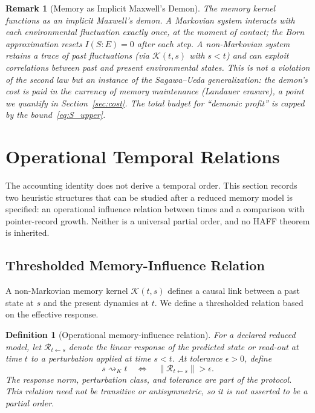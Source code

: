 \documentclass[12pt]{article}
\newtheorem{definition}[theorem]{Definition}
\newtheorem{remark}[theorem]{Remark}
\begin{document}
\begin{remark}[Memory as Implicit Maxwell's Demon]
\label{rem:demon}
The memory kernel functions as an \emph{implicit Maxwell's demon}.
A Markovian system interacts with each environmental fluctuation
exactly once, at the moment of contact; the Born approximation
resets $I(S{:}E) = 0$ after each step.
A non-Markovian system retains a trace of past fluctuations
(via $\mathcal{K}(t,s)$ with $s < t$) and can exploit
correlations between past and present environmental states.
This is not a violation of the second law but an instance of
the Sagawa--Ueda generalization: the demon's cost is paid in
the currency of memory maintenance (Landauer erasure), a point
we quantify in Section~\ref{sec:cost}.
The total budget for ``demonic profit'' is capped by the
bound~\eqref{eq:S_upper}.
\end{remark}

\section{Operational Temporal Relations}
\label{sec:arrow}

The accounting identity does not derive a temporal order.  This section
records two heuristic structures that can be studied after a reduced
memory model is specified: an operational influence relation between
times and a comparison with pointer-record growth.  Neither is a
universal partial order, and no HAFF theorem is inherited.

\subsection{Thresholded Memory-Influence Relation}

A non-Markovian memory kernel $\mathcal{K}(t,s)$ defines a
causal link between a past state at $s$ and the present dynamics
at $t$.
We define a thresholded relation based on the effective response.

\begin{definition}[Operational memory-influence relation]
\label{def:memory_order}
For a declared reduced model, let $\mathcal R_{t\leftarrow s}$ denote
the linear response of the predicted state or read-out at time $t$ to
a perturbation applied at time $s<t$.  At tolerance $\epsilon>0$, define
\begin{equation}
\label{eq:memory_order}
s\rightsquigarrow_K t
\quad\Longleftrightarrow\quad
\|\mathcal R_{t\leftarrow s}\|>\epsilon .
\end{equation}
The response norm, perturbation class, and tolerance are part of the
protocol.  This relation need not be transitive or antisymmetric, so it
is not asserted to be a partial order.
\end{definition}
\end{document}
